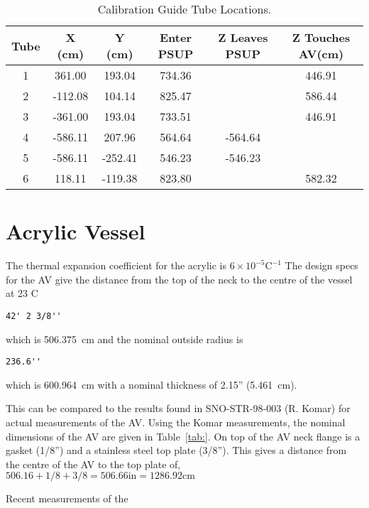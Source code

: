 \begin{table}
  \begin{center}
    \begin{tabular}{cccccc}
      \hline
      Tube & X (cm)& Y (cm)& Enter PSUP & Z Leaves PSUP & Z Touches
      AV(cm)\\
      \hline
      1&361.00&193.04& 734.36& &446.91 \\
      2&-112.08& 104.14& 825.47& &586.44 \\
      3&-361.00& 193.04& 733.51& &446.91 \\
      4&-586.11& 207.96& 564.64& -564.64 & \\
      5&-586.11&-252.41& 546.23& -546.23 & \\
      6& 118.11&-119.38& 823.80& & 582.32\\
      \hline
    \end{tabular}
  \end{center}
  \caption{Calibration Guide Tube Locations.}
  \label{tab:guidtubeheight}
\end{table}

\section{Acrylic Vessel}
The thermal expansion coefficient for the acrylic is
\begin{math}
  6\times 10^{-5}\textrm{C}^{-1}
\end{math}
The design specs for the AV give the distance from the top of the neck
to the centre of the vessel at 23 C
\begin{verbatim}
42' 2 3/8''
\end{verbatim}
which is 506.375~cm and the nominal outside radius is
\begin{verbatim}
236.6''
\end{verbatim}
which is 600.964~cm with a nominal thickness of 2.15'' (5.461~cm).

This can be compared to the results found in SNO-STR-98-003 (R. Komar)
for actual measurements of the AV. Using the Komar measurements, the
nominal dimensions of the AV are given in Table~\ref{tab:}. On top of the AV
neck flange is a gasket (1/8'') and a stainless steel top plate
(3/8''). This gives a distance from the centre of the AV to the top
plate of,
\begin{math}
  506.16 + 1/8 + 3/8 = 506.66\textrm{in} = 1286.92\textrm{cm}
\end{math}

Recent measurements of the 

